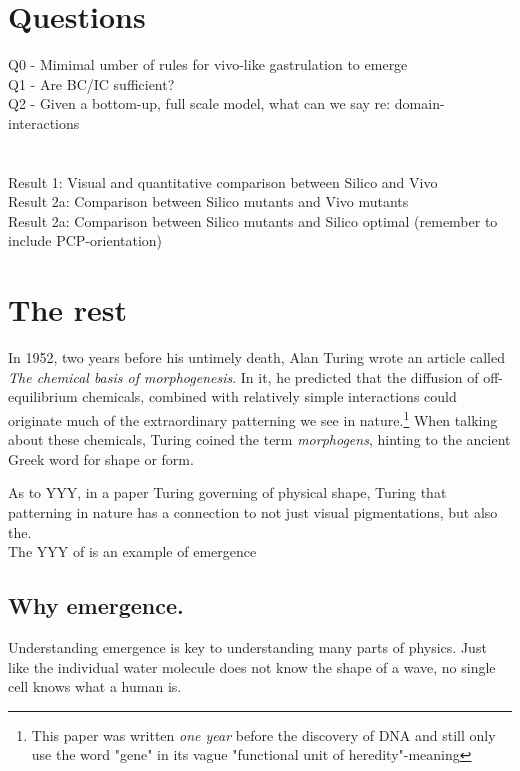 
\section{Questions}
Q0 - Mimimal umber of rules for vivo-like gastrulation to emerge\\
Q1 - Are BC/IC sufficient?\\
Q2 - Given a bottom-up, full scale model, what can we say re: domain-interactions\\
\\\\
Result 1: Visual and quantitative comparison between Silico and Vivo\\
Result 2a: Comparison between Silico mutants and Vivo mutants\\
Result 2a: Comparison between Silico mutants and Silico optimal (remember to include PCP-orientation)\\

\section{The rest}
In 1952, two years before his untimely death, Alan Turing wrote an article called
\textit{The chemical basis of morphogenesis}.\cite{turing52the} In it, he predicted that the diffusion of off-equilibrium chemicals, combined with relatively simple interactions could originate much of the extraordinary patterning we see in nature.\footnote{This paper was written \textit{one year} before the discovery of DNA and still only use the word "gene" in its vague "functional unit of heredity"-meaning} When talking about these chemicals, Turing coined the term \textit{morphogens}, hinting to the ancient Greek word for shape or form. 

As to YYY, in a paper Turing governing of physical shape, Turing that patterning in nature has a connection to not just visual pigmentations, but also the. \\


The YYY of is an example of emergence
\subsection{Why emergence. }

Understanding emergence is key to understanding many parts of physics. Just like the individual water molecule does not know the shape of a wave, no single cell knows what a human is. 


